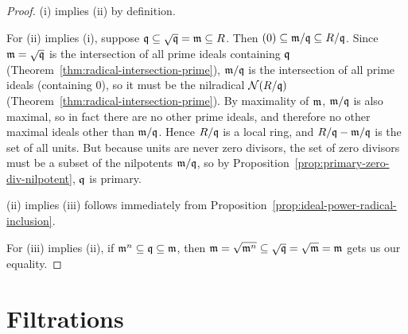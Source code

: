 \begin{proof}
    (i) implies (ii) by definition.

    For (ii) implies (i), suppose \(\mathfrak{q} \subseteq \sqrt{\mathfrak{q}} = \mathfrak{m} \subseteq R\).
    Then \((0) \subseteq \mathfrak{m}/\mathfrak{q} \subseteq R/\mathfrak{q}\).
    Since \(\mathfrak{m} = \sqrt{\mathfrak{q}}\) is the intersection of all prime ideals containing \(\mathfrak{q}\) (Theorem~\ref{thm:radical-intersection-prime}),
    \(\mathfrak{m}/\mathfrak{q}\) is the intersection of all prime ideals (containing 0),
    so it must be the nilradical \(\mathcal{N}(R/\mathfrak{q})\) (Theorem~\ref{thm:radical-intersection-prime}).
    By maximality of \(\mathfrak{m}\), \(\mathfrak{m}/\mathfrak{q}\) is also maximal,
    so in fact there are no other prime ideals, and therefore no other maximal ideals other than \(\mathfrak{m}/\mathfrak{q}\).
    Hence \(R/\mathfrak{q}\) is a local ring, and \(R/\mathfrak{q}-\mathfrak{m}/\mathfrak{q}\) is the set of all units.
    But because units are never zero divisors,
    the set of zero divisors must be a subset of the nilpotents \(\mathfrak{m}/\mathfrak{q}\),
    so by Proposition~\ref{prop:primary-zero-div-nilpotent},
    \(\mathfrak{q}\) is primary.

    (ii) implies (iii) follows immediately from Proposition~\ref{prop:ideal-power-radical-inclusion}.

    For (iii) implies (ii), if \(\mathfrak{m}^n \subseteq \mathfrak{q} \subseteq \mathfrak{m}\),
    then \(\mathfrak{m} = \sqrt{\mathfrak{m}^n} \subseteq \sqrt{\mathfrak{q}} = \sqrt{\mathfrak{m}} = \mathfrak{m}\)
    gets us our equality.
\end{proof}


\section{Filtrations}

